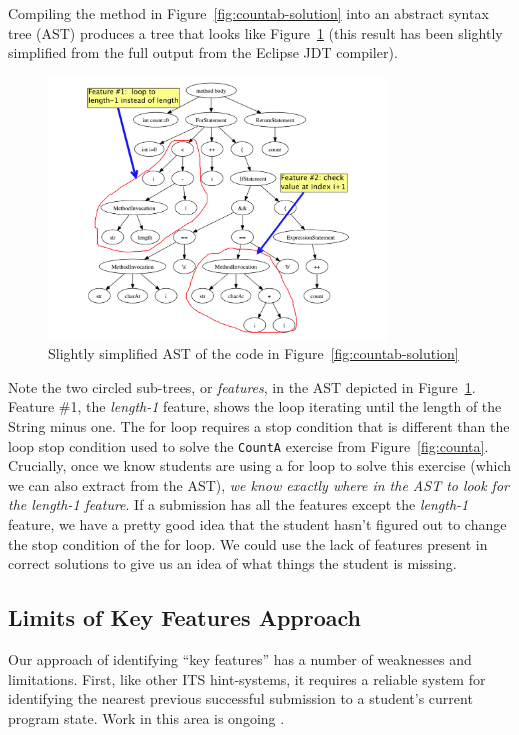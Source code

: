 \documentclass{sig-alternate}
\begin{document}
Compiling the method in Figure~\ref{fig:countab-solution} into an
abstract syntax tree (AST) produces a tree that looks like
Figure~\ref{fig:countab-ast} (this result has been slightly simplified
from the full output from the Eclipse JDT compiler).

\begin{figure}[h]
\includegraphics[width=90mm]{images/forloop-highlight.png}
\caption{Slightly simplified AST of the code in Figure~\ref{fig:countab-solution}}
\label{fig:countab-ast}
\end{figure}

Note the two circled sub-trees, or {\em features}, in the AST depicted
in Figure~\ref{fig:countab-ast}.  Feature \#1, the {\em
  length-1} feature, shows the loop iterating
until the length of the String minus one.  The for loop requires a
stop condition that is different
than the loop stop condition used to solve the {\tt CountA} exercise from
Figure~\ref{fig:counta}.  Crucially, once we know students are
using a for loop to solve this exercise (which we can also
extract from the AST), {\em we know exactly where in the AST to
  look for the length-1 feature}.  If a submission has all the
features except the {\em length-1} feature, we have a pretty good idea
that the student hasn't figured out to change the stop condition of the
for loop.  We could use the lack of features present in correct
solutions to give us an idea of what things the student is missing.


\subsection{Limits of Key Features Approach}

Our approach of identifying ``key features'' has a number of
weaknesses and limitations.  First, like other ITS hint-systems, it
requires a reliable system for identifying the nearest previous successful
submission to a student's current program state.  Work in this area is
ongoing \cite{rivers-its2012,Jin:2012:PRA:2345840.2345889}.
\end{document}
